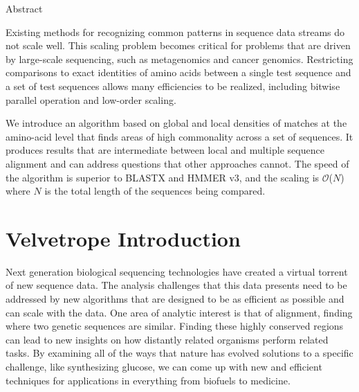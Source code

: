 \documentclass[phd,tocprelim]{cornell}
\begin{document}
\normalspacing

\begin{center}
   Abstract 
\end{center}

Existing methods for recognizing common patterns in sequence data
streams do not scale well. This scaling problem becomes critical for
problems that are driven by large-scale sequencing, such as
metagenomics and cancer genomics.  Restricting comparisons to exact
identities of amino acids between a single test sequence and a set of
test sequences allows many efficiencies to be realized, including
bitwise parallel operation and low-order scaling.

We introduce an algorithm based on global and local densities of
matches at the amino-acid level that finds areas of high commonality
across a set of sequences.  It produces results that are intermediate
between local and multiple sequence alignment and can address
questions that other approaches cannot.  The speed of the
algorithm is superior to BLASTX and HMMER v3, and the scaling is
$\mathcal{O}$($N$) where $N$ is the total length of the sequences
being compared.

\chapter{Velvetrope Introduction} %
\label{cha:Velvetrope Introduction}
\noindent
Next generation biological sequencing technologies have created a virtual torrent of new sequence data. The analysis challenges that this data presents need to be addressed by new algorithms that are designed to be as efficient as possible and can scale with the data. One area of analytic interest is that of alignment, finding where two genetic sequences are similar. Finding these highly conserved regions can lead to new insights on how distantly related organisms perform related tasks. By examining all of the ways that nature has evolved solutions to a specific challenge, like synthesizing glucose, we can come up with new and efficient techniques for applications in everything from biofuels to medicine.
\end{document}
